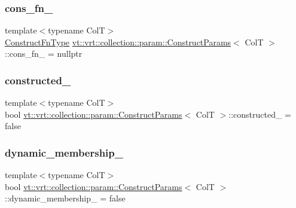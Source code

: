 \subsubsection{\texorpdfstring{cons\+\_\+fn\+\_\+}{cons\_fn\_}}
{\footnotesize\ttfamily template$<$typename ColT$>$ \\
\hyperlink{structvt_1_1vrt_1_1collection_1_1param_1_1_construct_params_a7ad7bdf4220701e54b485f45e08b1736}{Construct\+Fn\+Type} \hyperlink{structvt_1_1vrt_1_1collection_1_1param_1_1_construct_params}{vt\+::vrt\+::collection\+::param\+::\+Construct\+Params}$<$ ColT $>$\+::cons\+\_\+fn\+\_\+ = nullptr\hspace{0.3cm}{\ttfamily [private]}}

\mbox{\label{structvt_1_1vrt_1_1collection_1_1param_1_1_construct_params_afa286d4b8ca9798c7cf70f2a039ee49d}} 
\subsubsection{\texorpdfstring{constructed\+\_\+}{constructed\_}}
{\footnotesize\ttfamily template$<$typename ColT$>$ \\
bool \hyperlink{structvt_1_1vrt_1_1collection_1_1param_1_1_construct_params}{vt\+::vrt\+::collection\+::param\+::\+Construct\+Params}$<$ ColT $>$\+::constructed\+\_\+ = false\hspace{0.3cm}{\ttfamily [private]}}

\mbox{\label{structvt_1_1vrt_1_1collection_1_1param_1_1_construct_params_ab032b5a40a6ffdd0b763af5968cec42a}} 
\subsubsection{\texorpdfstring{dynamic\+\_\+membership\+\_\+}{dynamic\_membership\_}}
{\footnotesize\ttfamily template$<$typename ColT$>$ \\
bool \hyperlink{structvt_1_1vrt_1_1collection_1_1param_1_1_construct_params}{vt\+::vrt\+::collection\+::param\+::\+Construct\+Params}$<$ ColT $>$\+::dynamic\+\_\+membership\+\_\+ = false\hspace{0.3cm}{\ttfamily [private]}}

